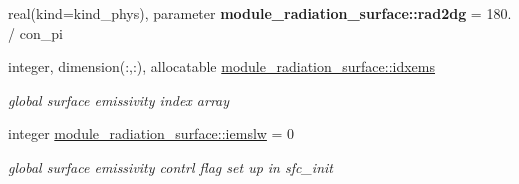 \begin{DoxyCompactItemize}
\item 
\mbox{\label{group__module__radiation__surface_gab879c7cf4e0774089a626e54226e4c1b}} 
real(kind=kind\+\_\+phys), parameter {\bfseries module\+\_\+radiation\+\_\+surface\+::rad2dg} = 180. / con\+\_\+pi
\item 
\mbox{\label{group__module__radiation__surface_gac33f1f3441f8336d7eb7e15cba26caf7}} 
integer, dimension(\+:,\+:), allocatable \hyperlink{group__module__radiation__surface_gac33f1f3441f8336d7eb7e15cba26caf7}{module\+\_\+radiation\+\_\+surface\+::idxems}
\begin{DoxyCompactList}\small\item\em global surface emissivity index array \end{DoxyCompactList}\item 
\mbox{\label{group__module__radiation__surface_ga3ceebb99dbffcb70a14cfcaa7b029abc}} 
integer \hyperlink{group__module__radiation__surface_ga3ceebb99dbffcb70a14cfcaa7b029abc}{module\+\_\+radiation\+\_\+surface\+::iemslw} = 0
\begin{DoxyCompactList}\small\item\em global surface emissivity contrl flag set up in \textquotesingle{}sfc\+\_\+init\textquotesingle{} \end{DoxyCompactList}\end{DoxyCompactItemize}
